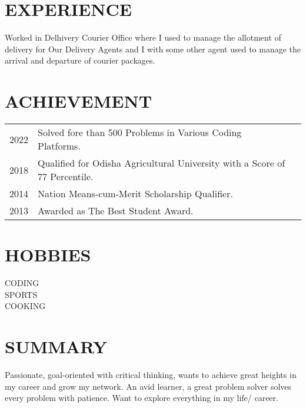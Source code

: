 \documentclass[]{deedy-resume-openfont}
\begin{document}
\begin{minipage}[t]{0.66\textwidth}

\section{EXPERIENCE}
Worked in Delhivery Courier Office where I used to manage the allotment of delivery for Our Delivery Agents and I with some other agent used to manage the arrival and departure of courier packages. 
\sectionsep



\section{ACHIEVEMENT} 
\begin{tabular}{rll}

2022     & Solved fore than 500 Problems in Various Coding Platforms. \\
2018     & Qualified for Odisha Agricultural University with a Score of 77 Percentile. \\
2014     & Nation Means-cum-Merit Scholarship Qualifier. \\
2013     & Awarded as The Best Student Award. \\
\end{tabular}
\sectionsep

\section{HOBBIES}
CODING \\
SPORTS \\
COOKING


\section{SUMMARY} 

Passionate, goal-oriented with critical thinking, wants to achieve great heights in my career and grow my network. An avid learner, a great problem solver solves every problem with patience. Want to explore everything in my life/ career.

\end{minipage} 
\end{document}
